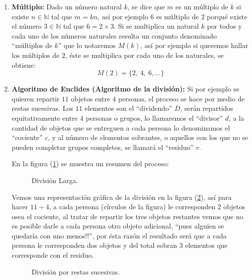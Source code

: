 \begin{enumerate}
    \item \textbf{Múltiplo:} Dado un número natural $k$, se dice que $m$ es un múltiplo de $k$ si existe $n\in \mathbb{N}$ tal que $m=kn$, así por ejemplo $6$ es múltiplo de $2$ porqué existe el número $3\in \mathbb{N}$ tal que $6=2\times 3$. Si se multiplica un natural $k$ por todos y cada uno de los números naturales resulta un conjunto denominado ``múltiplos de $k$'' que lo notaremos $M(k)$, así por ejemplo si queremos hallar los múltiplos de $2$, éste se multiplica por cada uno de los naturales, se obtiene:
    \[ M(2)=\{ 2,\ 4,\ 6, \dots \} \]

    \item \textbf{Algoritmo de Euclides (Algoritmo de la división):} Si por ejemplo se quieren repartir $11$ objetos entre $4$ personas, el proceso se hace por medio de restas sucesivas. Los $11$ elementos son el ``dividendo'' $D$, serán repartidos equitativamente entre $4$ personas o grupos, lo llamaremos el ``divisor'' $d$, a la cantidad de objetos que se entreguen a cada persona lo denominamos el ``cociente'' $c$, y al número de elementos sobrantes, o aquellos con los que no se pueden completar grupos completos, se llamará el ``residuo'' $r$.
    
    En la figura (\ref{fig:divisionlarga}) se muestra un resumen del proceso:
    \begin{figure}[ht]
    \centering
    \caption{División Larga.}\label{fig:divisionlarga}
    \end{figure}

    Vemos una representación gráfica de la división en la figura (\ref{fig:divisiongraph}), así para hacer $11\div 4$, a cada persona (círculos de la figura) le corresponden $2$ objetos osea el cociente, al tratar de repartir los tres objetos restantes vemos que no es posible darle a cada persona otro objeto adicional, ``pues alguien se quedaría con uno menos!!'', por ésta razón el resultado será que a cada persona le corresponden dos objetos y del total sobran $3$ elementos que corresponde con el residuo.
    
    \begin{figure}[ht]
    \begin{center}
    \caption{División por restas sucesivas.}\label{fig:divisiongraph}
    \end{center}  
    \end{figure}


\end{enumerate}
